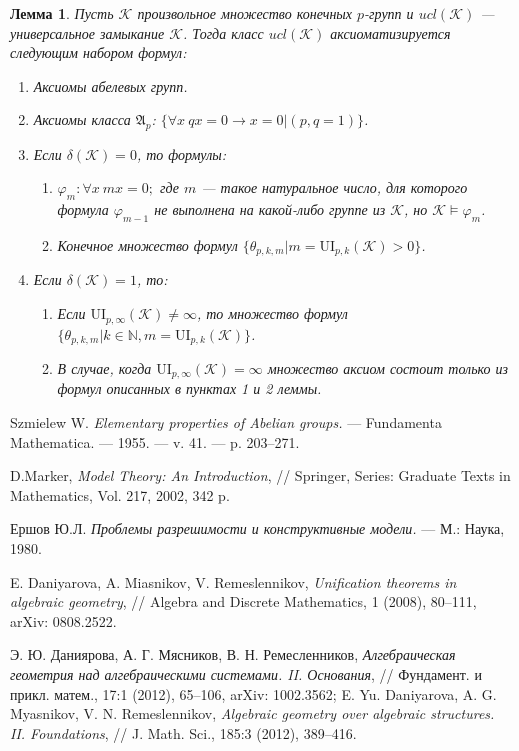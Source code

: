 \documentclass[a4paper,11pt,twoside]{article}
\newtheorem{lemma}{Лемма}[section]
\def\note#1{\marginpar{\textcolor{red}{#1}}}
\def\A{{\mathfrak{A}}}
\def\K{{\mathcal{K}}}
\def\N{{\mathbb{N}}}
\def\ui{{\mathrm{UI}}}
\begin{document}
\begin{lemma}
Пусть $\K$ произвольное множество конечных $p$-групп и $ucl(\K)$ --- универсальное замыкание $\K$. Тогда класс $ucl(\K)$ аксиоматизируется следующим набором формул:
\begin{enumerate}
\item Аксиомы абелевых групп.
\item Аксиомы класса $\A_p$: $\{ \forall x \ qx = 0 \rightarrow x = 0 | (p,q = 1) \}$.
\item Если $\delta(\K) = 0$, то формулы:
\begin{enumerate}
\item $\varphi_m: \forall x \ mx = 0;$ где $m$ --- такое натуральное число, для которого формула $\varphi_{m-1}$ не выполнена на какой-либо группе из $\K$, но $\K \models \varphi_m$. 
\item Конечное множество формул $\{\theta_{p,k,m} |  m = \ui_{p,k}(\K) > 0 \}$.
\end{enumerate}
\item Если $\delta(\K) = 1$, то:
\begin{enumerate}
\item Если $\ui_{p, \infty}(\K) \neq \infty$, то множество формул $\{ \theta_{p,k,m} | k \in \N, m = \ui_{p,k}(\K)\}$.
\item В случае, когда $\ui_{p, \infty}(\K) = \infty$ множество аксиом состоит только из формул описанных в пунктах 1 и 2 леммы.
\end{enumerate}
\end{enumerate}
\end{lemma}








\begin{thebibliography}{}

 Szmielew W. \textit{Elementary properties of Abelian groups.} — Fundamenta Mathematica. —
1955. — v. 41. — p. 203–271.

 D.Marker, \textit{Model Theory: An Introduction}, // Springer, Series: Graduate Texts in Mathematics, Vol. 217, 2002, 342 p.

 Ершов Ю.Л. \textit{Проблемы разрешимости и конструктивные модели.} --- М.: Наука, 1980.

 E. Daniyarova, A. Miasnikov, V. Remeslennikov, \textit{Unification theorems in algebraic geometry}, // Algebra and Discrete Mathematics, 1 (2008), 80--111, arXiv: 0808.2522.


 \note{Проверить ссылку} Э. Ю. Даниярова, А. Г. Мясников, В. Н. Ремесленников, \textit{Алгебраическая геометрия над алгебраическими системами. II. Основания}, // Фундамент. и прикл. матем., 17:1 (2012), 65--106, arXiv: 1002.3562; E. Yu. Daniyarova, A. G. Myasnikov, V. N. Remeslennikov, \textit{Algebraic geometry over algebraic structures. II. Foundations}, // J. Math. Sci., 185:3 (2012), 389--416.

\end{thebibliography}
\end{document}
